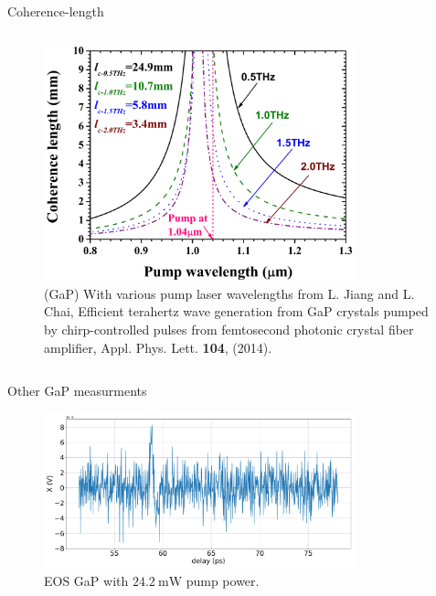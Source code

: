 \documentclass[aspectratio=1610, 9pt]{beamer}
\begin{document}
\begin{frame}{Coherence-length}
\begin{center}
\begin{columns}
\begin{column}{.4\textwidth}
\begin{figure}
      \includegraphics[width=0.8\textwidth]{images/GAP_coherencelength.png}
      \caption{\tiny{\textcolor{tugreen}{(GaP) With various pump laser wavelengths} from L. Jiang and L. Chai, Efficient terahertz wave generation from GaP crystals pumped by chirp-controlled pulses from femtosecond photonic crystal fiber amplifier,  Appl. Phys. Lett. \textbf{104}, (2014)\nocite{GaP_coherence_length}.}}
    \end{figure}
    \end{column}
  \end{columns}
\end{center} 
\end{frame}

\begin{frame}{Other GaP measurments}
  \begin{figure}
    \includegraphics[width=0.8\textwidth]{images/GaP14_20_20normalX.pdf}
    \caption{EOS GaP with $\SI{24.2}{\milli\W}$ pump power.}
  \end{figure}
\end{frame}
\end{document}
